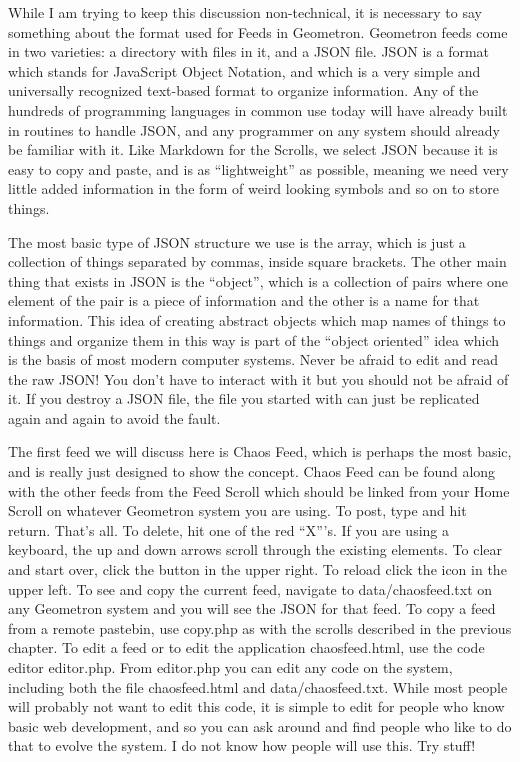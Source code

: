 While I am trying to keep this discussion non-technical, it is necessary to say something about the format used for Feeds in Geometron.  Geometron feeds come in two varieties: a directory with files in it, and a JSON file.  JSON is a format which stands for JavaScript Object Notation, and which is a very simple and universally recognized text-based format to organize information.  Any of the hundreds of programming languages in common use today will have already built in routines to handle JSON, and any programmer on any system should already be familiar with it.  Like Markdown for the Scrolls, we select JSON because it is easy to copy and paste, and is as ``lightweight'' as possible, meaning we need very little added information in the form of weird looking symbols and so on to store things.  

The most basic type of JSON structure we use is the array, which is just a collection of things separated by commas, inside square brackets.  The other main thing that exists in JSON is the ``object'', which is a collection of pairs where one element of the pair is a piece of information and the other is a name for that information.  This idea of creating abstract objects which map names of things to things and organize them in this way is part of the ``object oriented'' idea which is the basis of most modern computer systems.  Never be afraid to edit and read the raw JSON!  You don't have to interact with it but you should not be afraid of it.  If you destroy a JSON file, the file you started with can just be replicated again and again to avoid the fault.

The first feed we will discuss here is Chaos Feed, which is perhaps the most basic, and is really just designed to show the concept.  Chaos Feed can be found along with the other feeds from the Feed Scroll which should be linked from your Home Scroll on whatever Geometron system you are using.  To post, type and hit return. That's all.  To delete, hit one of the red ``X'''s.  If you are using a keyboard, the up and down arrows scroll through the existing elements.  To clear and start over, click the button in the upper right.  To reload click the icon in the upper left.  To see and copy the current feed, navigate to data/chaosfeed.txt on any Geometron system and you will see the JSON for that feed.  To copy a feed from a remote pastebin, use copy.php as with the scrolls described in the previous chapter.  To edit a feed or to edit the application chaosfeed.html, use the code editor editor.php.  From editor.php you can edit any code on the system, including both the file chaosfeed.html and data/chaosfeed.txt.  While most people will probably not want to edit this code, it is simple to edit for people who know basic web development, and so you can ask around and find people who like to do that to evolve the system.  I do not know how people will use this. Try stuff!

